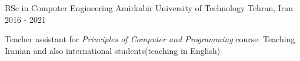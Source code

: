

\begin{cventries}

  \cventry
    {BSc in Computer Engineering} %
    {Amirkabir University of Technology} %
    {Tehran, Iran} %
    {2016 - 2021} %
    {
      \begin{cvitems} %
        \item {Teacher assistant for \textit{Principles of Computer and Programming} course. 
        Teaching Iranian and also international students(teaching in English)}
      \end{cvitems}
    }
    
    
\end{cventries}
